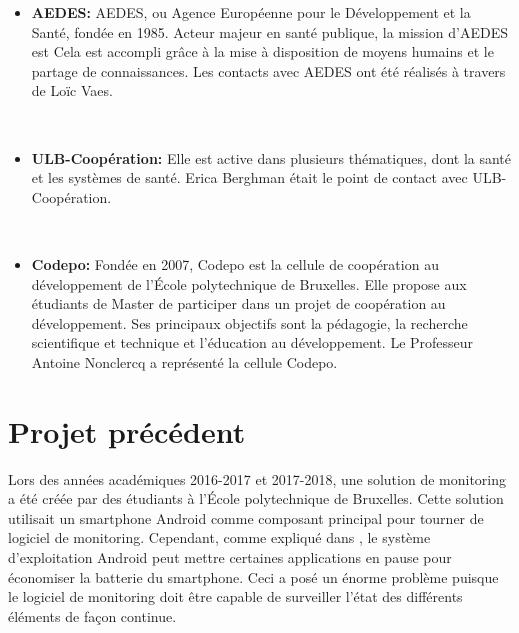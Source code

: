 \begin{itemize}
  \item \textbf{AEDES:} AEDES, ou Agence Européenne pour le Développement et la Santé, \cite{aedes} fondée en 1985. Acteur majeur en santé publique, la mission d'AEDES est \cite{aedes} Cela est accompli grâce à la mise à disposition de moyens humains et le partage de connaissances. Les contacts avec AEDES ont été réalisés à travers de Loïc Vaes.

  ~

  \item \textbf{ULB-Coopération:}  \cite{ulb_coop} Elle est active dans plusieurs thématiques, dont la santé et les systèmes de santé. \cite{ulb_coop} Erica Berghman était le point de contact avec ULB-Coopération.

  ~

  \item \textbf{Codepo:} Fondée en 2007, Codepo est la cellule de coopération au développement de l'École polytechnique de Bruxelles. Elle propose aux étudiants de Master de participer dans un projet de coopération au développement. Ses principaux objectifs sont la pédagogie, la recherche scientifique et technique et l'éducation au développement. \cite{codepo} Le Professeur Antoine Nonclercq a représenté la cellule Codepo.

\end{itemize}

\section{Projet précédent}

\noindent
Lors des années académiques 2016-2017 et 2017-2018, une solution de monitoring a été créée par des étudiants à l'École polytechnique de Bruxelles. Cette solution utilisait un smartphone Android comme composant principal pour tourner de logiciel de monitoring. Cependant, comme expliqué dans \cite{delobbe_2017}, le système d'exploitation Android peut mettre certaines applications en pause pour économiser la batterie du smartphone. Ceci a posé un énorme problème puisque le logiciel de monitoring doit être capable de surveiller l'état des différents éléments de façon continue.

